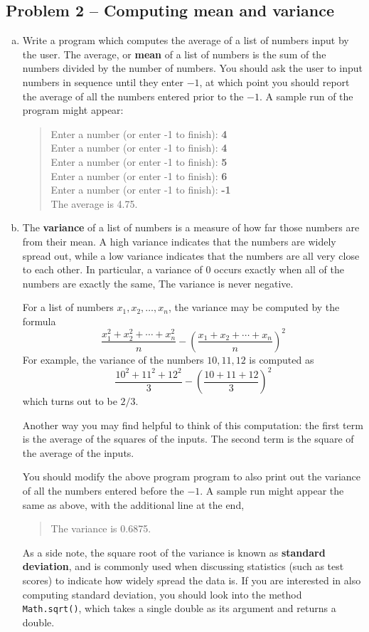\documentclass[11pt]{article}
\theoremstyle{plain}
\theoremstyle{definition}
\theoremstyle{remark}
\newcommand{\paren}[1]{{\left({#1}\right)}}
\begin{document}
\subsection*{Problem 2 -- Computing mean and variance}
\begin{enumerate}[(a)]
  \item Write a program which computes the average of a list of numbers input by
    the user. The average, or \textbf{mean} of a list of numbers is the sum of
    the numbers divided by the number of numbers. You should ask the user to
    input numbers in sequence until they enter $-1$, at which point you should
    report the average of all the numbers entered prior to the $-1$. A sample
    run of the program might appear: \begin{quote}
  Enter a number (or enter -1 to finish): \textbf{4} \\
  Enter a number (or enter -1 to finish): \textbf{4} \\
  Enter a number (or enter -1 to finish): \textbf{5} \\
  Enter a number (or enter -1 to finish): \textbf{6} \\
  Enter a number (or enter -1 to finish): \textbf{-1} \\
  The average is 4.75.
\end{quote}
  \item The \textbf{variance} of a list of numbers is a measure of how far those
    numbers are from their mean. A high variance indicates that the numbers are
    widely spread out, while a low variance indicates that the numbers are all
    very close to each other. In particular, a variance of $0$ occurs exactly
    when all of the numbers are exactly the same, The variance is never
    negative.

For a list of numbers $x_1, x_2, \ldots, x_n$, the variance may be computed by
the formula \[ \frac{x_1^2 + x_2^2 + \cdots + x_n^2}{n} - \paren{\frac{x_1 + x_2
+ \cdots + x_n}{n}}^2 \] For example, the variance of the numbers $10, 11, 12$
is computed as \[ \frac{10^2 + 11^2 + 12^2}{3} - \paren{\frac{10 + 11 +
12}{3}}^2 \] which turns out to be $2/3$.

Another way you may find helpful to think of this computation: the first term is
the average of the squares of the inputs. The second term is the square of the
average of the inputs.

You should modify the above program program to also print out the variance of
all the numbers entered before the $-1$. A sample run might appear the same as
above, with the additional line at the end,
\begin{quote}
  The variance is 0.6875.
\end{quote}
As a side note, the square root of the variance is known as \textbf{standard
deviation}, and is commonly used when discussing statistics (such as test
scores) to indicate how widely spread the data is. If you are interested in also
computing standard deviation, you should look into the method {\tt
Math.sqrt()}, which takes a single double as its argument and returns a double.
\end{enumerate}
\end{document}
